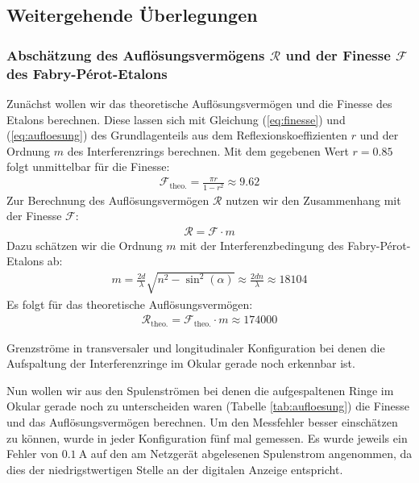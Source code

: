 \documentclass[11pt, a4paper]{article}
\begin{document}
\subsection{Weitergehende Überlegungen}
\subsubsection{Abschätzung des Auflösungsvermögens $\mathcal{R}$ und der Finesse $\mathcal{F}$ des Fabry-Pérot-Etalons}
Zunächst wollen wir das theoretische Auflösungsvermögen und die Finesse des Etalons berechnen.
Diese lassen sich mit Gleichung (\ref{eq:finesse}) und (\ref{eq:aufloesung}) des Grundlagenteils aus dem Reflexionskoeffizienten $r$ und der Ordnung $m$ des Interferenzrings berechnen.
Mit dem gegebenen Wert $r = \num{0,85}$ folgt unmittelbar für die Finesse:
\begin{align*}
	\mathcal{F_\mathrm{theo.}} = \frac{\pi r}{1 - r^2} \approx \num{9.62}
\end{align*}
Zur Berechnung des Auflösungsvermögen $\mathcal{R}$ nutzen wir den Zusammenhang mit der Finesse $\mathcal{F}$:
\begin{align*}
\mathcal{R} = \mathcal{F} \cdot m
\end{align*}
Dazu schätzen wir die Ordnung $m$ mit der Interferenzbedingung des Fabry-Pérot-Etalons ab:
\begin{align*}
m = \frac{2 d}{\lambda} \sqrt{n^2 - \sin^2(\alpha)} \approx \frac{2 d n}{\lambda} \approx 18104
\end{align*}
Es folgt für das theoretische Auflösungsvermögen:
\begin{align*}
	\mathcal{R}_\mathrm{theo.} = \mathcal{F}_\mathrm{theo.} \cdot m  \approx \num{174000}
\end{align*}
\begin{table}[h]
	\centering
	
	\caption{Grenzströme in transversaler und longitudinaler Konfiguration bei denen die Aufspaltung der Interferenzringe im Okular gerade noch erkennbar ist.}
	\label{tab:aufloesung}
\end{table}
Nun wollen wir aus den Spulenströmen bei denen die aufgespaltenen Ringe im Okular gerade noch zu unterscheiden waren (Tabelle \ref{tab:aufloesung}) die Finesse und das Auflösungsvermögen berechnen.
Um den Messfehler besser einschätzen zu können, wurde in jeder Konfiguration fünf mal gemessen.
Es wurde jeweils ein Fehler von $\SI{0.1}{\ampere}$ auf den am Netzgerät abgelesenen Spulenstrom angenommen, da dies der niedrigstwertigen Stelle an der digitalen Anzeige entspricht.
\end{document}
